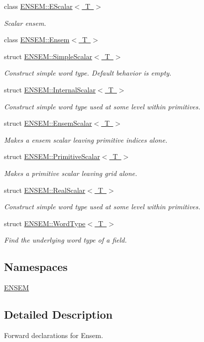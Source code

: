 \begin{DoxyCompactItemize}
class \mbox{\hyperlink{classENSEM_1_1EScalar}{E\+N\+S\+E\+M\+::\+E\+Scalar$<$ T $>$}}
\begin{DoxyCompactList}\small\item\em Scalar ensem. \end{DoxyCompactList}\item 
class \mbox{\hyperlink{classENSEM_1_1Ensem}{E\+N\+S\+E\+M\+::\+Ensem$<$ T $>$}}
\item 
struct \mbox{\hyperlink{structENSEM_1_1SimpleScalar}{E\+N\+S\+E\+M\+::\+Simple\+Scalar$<$ T $>$}}
\begin{DoxyCompactList}\small\item\em Construct simple word type. Default behavior is empty. \end{DoxyCompactList}\item 
struct \mbox{\hyperlink{structENSEM_1_1InternalScalar}{E\+N\+S\+E\+M\+::\+Internal\+Scalar$<$ T $>$}}
\begin{DoxyCompactList}\small\item\em Construct simple word type used at some level within primitives. \end{DoxyCompactList}\item 
struct \mbox{\hyperlink{structENSEM_1_1EnsemScalar}{E\+N\+S\+E\+M\+::\+Ensem\+Scalar$<$ T $>$}}
\begin{DoxyCompactList}\small\item\em Makes a ensem scalar leaving primitive indices alone. \end{DoxyCompactList}\item 
struct \mbox{\hyperlink{structENSEM_1_1PrimitiveScalar}{E\+N\+S\+E\+M\+::\+Primitive\+Scalar$<$ T $>$}}
\begin{DoxyCompactList}\small\item\em Makes a primitive scalar leaving grid alone. \end{DoxyCompactList}\item 
struct \mbox{\hyperlink{structENSEM_1_1RealScalar}{E\+N\+S\+E\+M\+::\+Real\+Scalar$<$ T $>$}}
\begin{DoxyCompactList}\small\item\em Construct simple word type used at some level within primitives. \end{DoxyCompactList}\item 
struct \mbox{\hyperlink{structENSEM_1_1WordType}{E\+N\+S\+E\+M\+::\+Word\+Type$<$ T $>$}}
\begin{DoxyCompactList}\small\item\em Find the underlying word type of a field. \end{DoxyCompactList}\end{DoxyCompactItemize}
\subsection*{Namespaces}
\begin{DoxyCompactItemize}
\item 
 \mbox{\hyperlink{namespaceENSEM}{E\+N\+S\+EM}}
\end{DoxyCompactItemize}


\subsection{Detailed Description}
Forward declarations for Ensem. 


